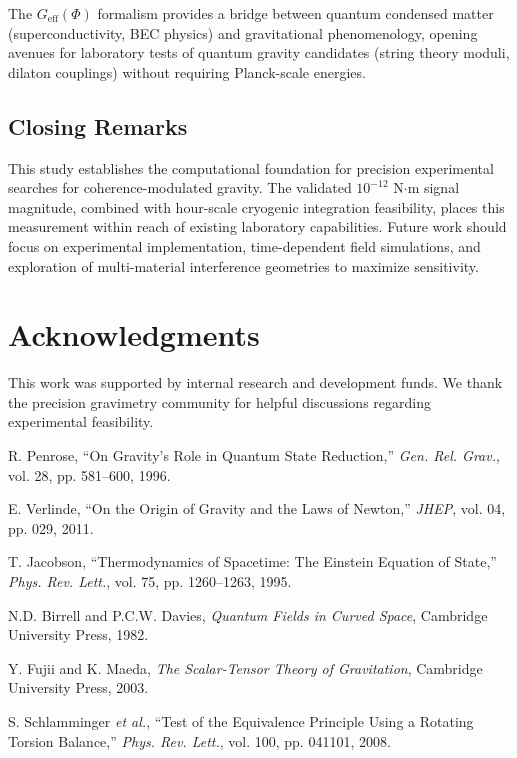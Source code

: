 \documentclass[10pt,twocolumn]{article}
\begin{document}
The $G_{\text{eff}}(\Phi)$ formalism provides a bridge between quantum condensed matter (superconductivity, BEC physics) and gravitational phenomenology, opening avenues for laboratory tests of quantum gravity candidates (string theory moduli, dilaton couplings) without requiring Planck-scale energies.

\subsection{Closing Remarks}

This study establishes the computational foundation for precision experimental searches for coherence-modulated gravity. The validated $10^{-12}$ N$\cdot$m signal magnitude, combined with hour-scale cryogenic integration feasibility, places this measurement within reach of existing laboratory capabilities. Future work should focus on experimental implementation, time-dependent field simulations, and exploration of multi-material interference geometries to maximize sensitivity.

\section{Acknowledgments}

This work was supported by internal research and development funds. We thank the precision gravimetry community for helpful discussions regarding experimental feasibility.

\begin{thebibliography}{8}

R. Penrose, ``On Gravity's Role in Quantum State Reduction,'' \textit{Gen. Rel. Grav.}, vol. 28, pp. 581--600, 1996.

E. Verlinde, ``On the Origin of Gravity and the Laws of Newton,'' \textit{JHEP}, vol. 04, pp. 029, 2011.

T. Jacobson, ``Thermodynamics of Spacetime: The Einstein Equation of State,'' \textit{Phys. Rev. Lett.}, vol. 75, pp. 1260--1263, 1995.

N.D. Birrell and P.C.W. Davies, \textit{Quantum Fields in Curved Space}, Cambridge University Press, 1982.

Y. Fujii and K. Maeda, \textit{The Scalar-Tensor Theory of Gravitation}, Cambridge University Press, 2003.

S. Schlamminger \textit{et al.}, ``Test of the Equivalence Principle Using a Rotating Torsion Balance,'' \textit{Phys. Rev. Lett.}, vol. 100, pp. 041101, 2008.

\end{thebibliography}
\end{document}

